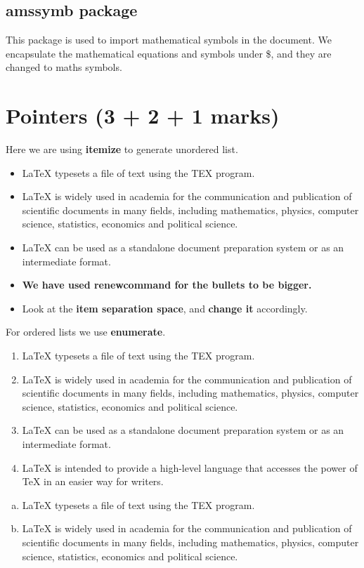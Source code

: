 \documentclass[12pt]{article}
\begin{document}
\subsection{amssymb package}
This package is used to import mathematical symbols in the document. We
encapsulate the mathematical equations and symbols under \$, and they are
changed to maths symbols.
\newpage
\section{Pointers (3 + 2 + 1 marks)}
Here we are using \textbf{itemize} to generate unordered list.
\renewcommand\labelitemi{\large$\bullet$}
\begin{itemize}
	\item \LaTeX{ } typesets a file of text using the TEX program.\\
	\item \LaTeX{ } is widely used in academia for the communication and publication
	of scientific documents in many fields, including mathematics, physics,
	computer science, statistics, economics and political science.\\
	\item \LaTeX{ } can be used as a standalone document preparation system or as an
	intermediate format.\\
	\item  \textbf{We have used renewcommand for the bullets to be bigger.}\\
	\item  Look at the \textbf{item separation space}, and \textbf{change it} accordingly.
\end{itemize}
For ordered lists we use \textbf{enumerate}.
\begin{enumerate}[I]
	\item \LaTeX{ } typesets a file of text using the TEX program.
	\item \LaTeX{ } is widely used in academia for the communication and publication
	of scientific documents in many fields, including mathematics, physics,
	computer science, statistics, economics and political science.
	\item \LaTeX{ } can be used as a standalone document preparation system or as an
	intermediate format.
	\item \LaTeX{ } is intended to provide a high-level language that accesses the power
	of TeX in an easier way for writers.
	\end{enumerate}
	\begin{enumerate}[(a)]
	\item \LaTeX{ } typesets a file of text using the TEX program.
	\item \LaTeX{ } is widely used in academia for the communication and publication
	of scientific documents in many fields, including mathematics, physics,
	computer science, statistics, economics and political science.
\end{enumerate}
\end{document}
